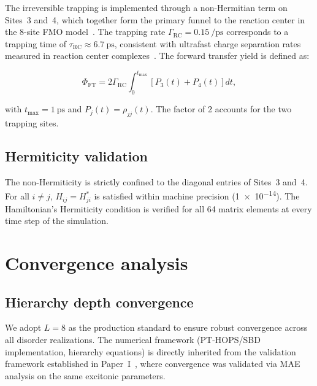 \documentclass[11pt,a4paper]{article}
\begin{document}
The irreversible trapping is implemented through a non-Hermitian term on Sites~3 and~4, which together form the primary funnel to the reaction center in the 8-site FMO model~\cite{Renger2003,Moix2011}.
The trapping rate $\Gamma_{\mathrm{RC}} = \qty{0.15}{\per\ps}$ corresponds to a trapping time of $\tau_{\mathrm{RC}} \approx \qty{6.7}{\ps}$, consistent with ultrafast charge separation rates measured in reaction center complexes~\cite{Renger2003}.
The forward transfer yield is defined as:

\begin{equation}
\Phi_{\mathrm{FT}} = 2\Gamma_{\mathrm{RC}} \int_0^{t_{\mathrm{max}}} \left[ P_3(t) + P_4(t) \right] dt,
\label{eq:SI_phi_ft}
\end{equation}

with $t_{\mathrm{max}} = \qty{1}{\ps}$ and $P_j(t) = \rho_{jj}(t)$.
The factor of 2 accounts for the two trapping sites.

\subsection{Hermiticity validation}

The non-Hermiticity is strictly confined to the diagonal entries of Sites~3 and~4.
For all $i \neq j$, $H_{ij} = H_{ji}^*$ is satisfied within machine precision (\num{1e-14}).
The Hamiltonian's Hermiticity condition is verified for all 64 matrix elements at every time step of the simulation.


\section{Convergence analysis}
\label{SI-sec:convergence}

\subsection{Hierarchy depth convergence}
We adopt $L=8$ as the production standard to ensure robust convergence across all disorder realizations. The numerical framework (PT-HOPS/SBD implementation, hierarchy equations) is directly inherited from the validation framework established in Paper~I~\cite{Kouam2026}, where convergence was validated via MAE analysis on the same excitonic parameters.
\end{document}
